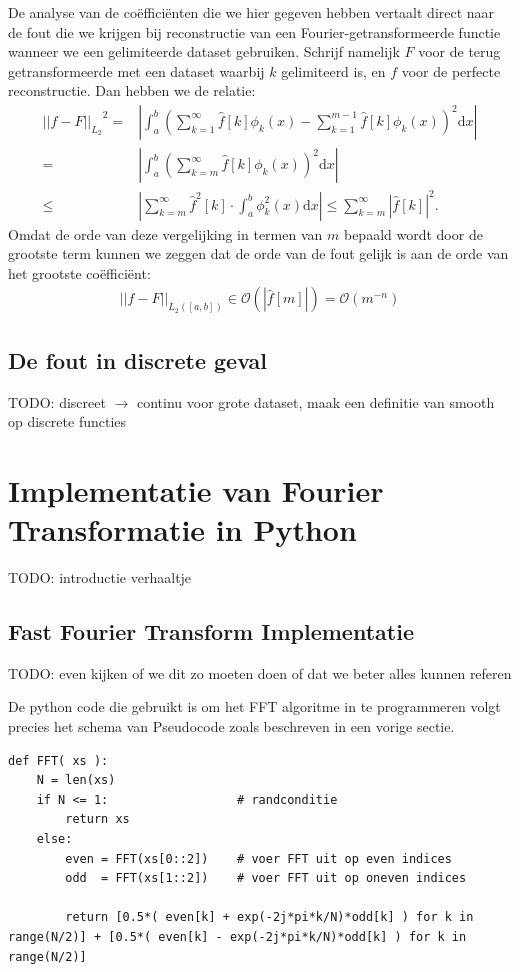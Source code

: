 \documentclass[11pt]{report}
\renewcommand{\O}{\mathcal{O}}
\theoremstyle{plain}
\theoremstyle{remark}
\newcommand{\eq}[1]{\begin{eqnarray*} #1 \end{eqnarray*}}
\newcommand{\dx}{\text{d}x}
\newcommand{\Ldnorm}[1]{{||#1||_{L_2}}}
\newcommand{\abso}[1]{{\left| #1 \right|}}
\begin{document}
De analyse van de co\"effici\"enten die we hier gegeven hebben vertaalt direct naar de fout die we krijgen
bij reconstructie van een Fourier-getransformeerde functie wanneer we een gelimiteerde dataset gebruiken.
Schrijf namelijk $F$ voor de terug getransformeerde met een dataset waarbij $k$ gelimiteerd is, en $f$ voor
de perfecte reconstructie. Dan hebben we de relatie:
\eq{
  \Ldnorm{ f - F }^2 =& 
  \abso{\int_a^b \left (\sum_{k=1}^\infty \hat f [k] \phi_k(x) 
    - \sum_{k=1}^{m-1} \hat f[k] \phi_k(x) \right)^2\dx } \\
  =& \abso{\int_a^b \left( \sum_{k=m}^\infty \hat f [k] \phi_k(x) \right)^2\dx } \\
  \leq& \abso{\sum_{k=m}^\infty \hat f^2 [k] \cdot \int_a^b \phi_k^2(x) \dx}
  \leq \sum_{k=m}^\infty \abso{\hat f[k]}^2.
}
Omdat de orde van deze vergelijking in termen van $m$ bepaald wordt door de grootste term kunnen we zeggen 
dat de orde van de fout gelijk is aan de orde van het grootste co\"effici\"ent:
\eq{
  ||f-F||_{L_2([a,b])} \in \O\left(\abso{\hat f[m]}\right) = \O(m^{-n})
}
\subsection{De fout in discrete geval}

TODO: discreet $\to$ continu voor grote dataset, maak een definitie van smooth op discrete functies

\section{Implementatie van Fourier Transformatie in Python}
TODO: introductie verhaaltje

\subsection{Fast Fourier Transform Implementatie}
TODO: even kijken of we dit zo moeten doen of dat we beter alles kunnen referen

De python code die gebruikt is om het FFT algoritme in te programmeren volgt precies het schema van Pseudocode
zoals beschreven in een vorige sectie.

\begin{lstlisting}[caption={FFT algoritme in Python, voert de pseudocode uit zoals in sectie (TODO)}]
def FFT( xs ):
    N = len(xs)
    if N <= 1:                  # randconditie
        return xs
    else:
        even = FFT(xs[0::2])    # voer FFT uit op even indices
        odd  = FFT(xs[1::2])    # voer FFT uit op oneven indices

        return [0.5*( even[k] + exp(-2j*pi*k/N)*odd[k] ) for k in range(N/2)] + [0.5*( even[k] - exp(-2j*pi*k/N)*odd[k] ) for k in range(N/2)]
\end{lstlisting}
\end{document}

